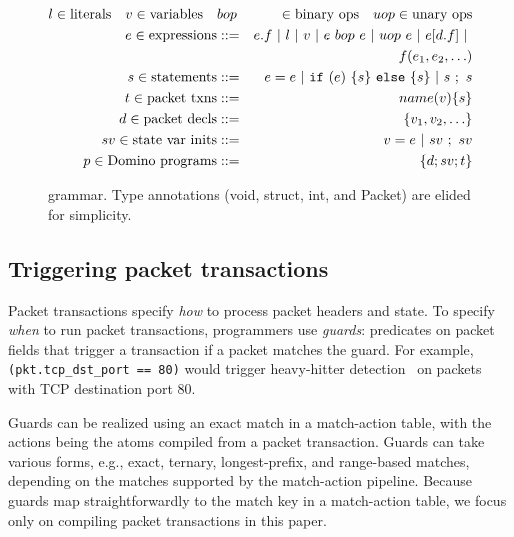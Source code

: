\begin{figure}
\newcommand{\sep}{~|~}
\begin{small}
\begin{eqnarray*}
l \in \text{literals} \quad v \in \text{variables} \quad &bop& \in \text{binary ops} \quad
uop \in \text{unary ops} \\
%
e \in \text{expressions} &::=& e.f \sep l \sep v \sep e~bop~e \sep uop~e \sep e[d.f] \sep \\
                   & &   f(e_1, e_2, \ldots) \\
%
s \in \text{statements} &::=& e = e \sep {\tt if}~(e)~\{ s \}~{\tt else}~ \{ s \} \sep s~;~s \\
%
t \in \text{packet txns} &::=& name(v) \{ s \} \\
%
%
d \in \text{packet decls} &::=& \{ v_1, v_2, \ldots \} \\
%
sv \in \text{state var inits} &::=& v = e \sep sv~;~sv \\
%
p \in \text{\pktlanguage programs} &::=& \{ d ; sv; t \}
\end{eqnarray*}
\end{small}
\caption{\pktlanguage grammar. Type annotations (void, struct, int, and Packet) are elided for simplicity.}
\label{fig:grammar}
\end{figure}


\subsection{Triggering packet transactions}
\label{ss:guards}
Packet transactions specify \textit{how} to process packet headers and state.  To
specify {\em when} to run packet transactions, programmers use {\em guards}:
predicates on packet fields that trigger a transaction if a packet
matches the guard. For example, {\tt (pkt.tcp\_dst\_port == 80)} would
trigger heavy-hitter detection~\cite{opensketch} on packets with TCP
destination port 80.

Guards can be realized using an exact match in a match-action table, with the
actions being the atoms compiled from a packet transaction. Guards
can take various forms, e.g., exact, ternary, longest-prefix, and range-based
matches, depending on the matches supported by the match-action
pipeline. Because guards map straightforwardly to the match key in a
match-action table, we focus only on compiling packet transactions in this paper.

